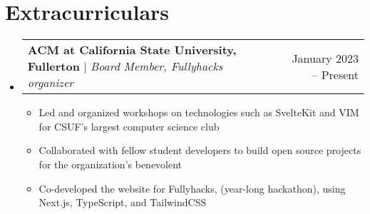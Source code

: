 \documentclass[letterpaper,11pt]{article}
\makeatletter
\newcommand{\resumeItem}[1]{
  \item\small{
    {#1 \vspace{-2pt}}
  }
}
\newcommand{\resumeProjectHeading}[2]{
    \item
    \begin{tabular*}{0.97\textwidth}{l@{\extracolsep{\fill}}r}
      \small#1 & #2 \\
    \end{tabular*}\vspace{-7pt}
}
\newcommand{\resumeSubHeadingListStart}{\begin{itemize}[leftmargin=0.15in, label={}]}
\newcommand{\resumeSubHeadingListEnd}{\end{itemize}}
\newcommand{\resumeItemListStart}{\begin{itemize}}
\newcommand{\resumeItemListEnd}{\end{itemize}\vspace{-5pt}}
\makeatother
\begin{document}
\section{Extracurriculars}
  \resumeSubHeadingListStart
        \resumeProjectHeading
          {\textbf{ACM at California State University, Fullerton} $|$ 
          \footnotesize\emph{Board Member, Fullyhacks organizer}}{January 2023 -- Present}
          \resumeItemListStart
          \resumeItem{Led and organized workshops on technologies such as SvelteKit and VIM for CSUF's largest computer science club}
          \resumeItem{Collaborated with fellow student developers to build open source projects for the organization's benevolent}
          \resumeItem{Co-developed the website for Fullyhacks, (year-long hackathon), using Next.js, TypeScript, and TailwindCSS}
          \resumeItemListEnd
    \resumeSubHeadingListEnd 
\end{document}
